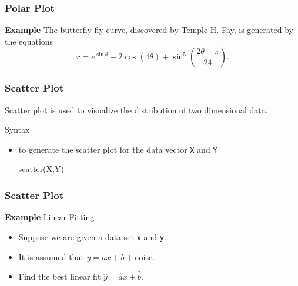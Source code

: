 \documentclass{beamer}  %
\begin{document}
\begin{frame}[fragile]
\frametitle{Polar Plot}
\textbf{Example} 
The butterfly fly curve, discovered by Temple H. Fay, is generated by the equations
\begin{equation}
r=e^{\sin \theta} - 2 \cos (4 \theta ) + \sin^5\left(\frac{2 \theta - \pi}{24}\right).
\end{equation}\pause

\setcounter{subfigure}{0}
\begin{figure}
    \centering
\end{figure}

\end{frame}
\begin{frame}[fragile]
\frametitle{Scatter Plot}
Scatter plot is used to visualize the distribution of two dimensional data.

\begin{block}{Syntax}
\begin{itemize}
    \item to generate the scatter plot for the data vector \texttt{X} and \texttt{Y}
          \begin{matlabcodebeamer}[numbers=none,frame=none,backgroundcolor=\color{blockbody}]
          scatter(X,Y)
          \end{matlabcodebeamer}
\end{itemize}
\end{block}


\end{frame}
\begin{frame}[fragile]
\frametitle{Scatter Plot}
\textbf{Example} Linear Fitting

\begin{itemize}[<+->]
    \item Suppose we are given a data set \texttt{x} and \texttt{y}.
    \item It is assumed that $y = ax + b + \mbox{noise}$.
    \item Find the best linear fit $\hat{y} = \hat{a} x + \hat{b}$.
\end{itemize}
\pause
\setcounter{subfigure}{0}
\begin{figure}
    \centering
\end{figure}

\end{frame}
\end{document}
